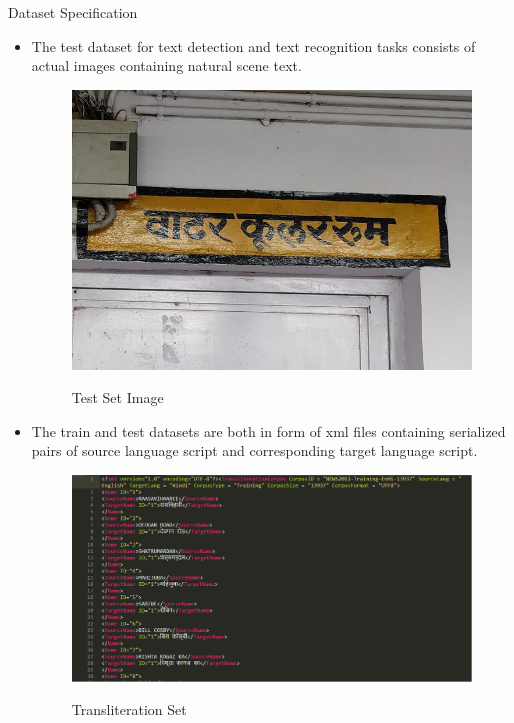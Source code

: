 \documentclass{beamer}
\begin{document}
\begin{frame}[allowframebreaks]{Dataset Specification}
\begin{itemize}
\begin{figure}
\begin{subfigure}[b]{0.2\linewidth}
			\caption{Set Annotation}
			\label{Annotation}
           \end{subfigure}
	\end{figure}
	\framebreak
	\item  The test dataset for text detection and text recognition tasks consists of actual images containing natural scene text.
	\begin{figure}
			{\includegraphics[scale=.3]{Test_Dataset}}
			\caption{Test Set Image}
			\label{Test_Image}
	\end{figure}
	\framebreak
	\item The train and test datasets are both in form of xml files containing serialized pairs of source language script and corresponding target language script.
	\begin{figure}
			{\includegraphics[scale=.3]{Transliteration_Dataset}}
			\caption{Transliteration Set}
			\label{Transliteration_Set}
	\end{figure}
\end{itemize}
\end{frame}
\end{document}
